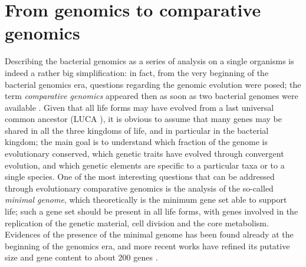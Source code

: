 \newpage
\section{From genomics to comparative genomics}
Describing the bacterial genomics as a series of analysis on a single organisms is indeed a rather big simplification: in fact, from the very beginning of the bacterial genomics era, questions regarding the genomic evolution were posed; the term \textit{comparative genomics} appeared then as soon as two bacterial genomes were available \cite{koonin1996complete}. Given that all life forms may have evolved from a last universal common ancestor (LUCA \cite{delaye2005last}\cite{koonin2005origin}), it is obvious to assume that many genes may be shared in all the three kingdoms of life, and in particular in the bacterial kingdom; the main goal is to understand which fraction of the genome is evolutionary conserved, which genetic traits have evolved through convergent evolution, and which genetic elements are specific to a particular taxa or to a single species. One of the most interesting questions that can be addressed through evolutionary comparative genomics is the analysis of the so-called \textit{minimal genome}, which theoretically is the minimum gene set able to support life; such a gene set should be present in all life forms, with genes involved in the replication of the genetic material, cell division and the core metabolism. Evidences of the presence of the minimal genome has been found already at the beginning of the genomics era, and more recent works have refined its putative size and gene content to about 200 genes \cite{koonin1996complete}\cite{koonin1996sequencing}\cite{gibson2008complete}.


